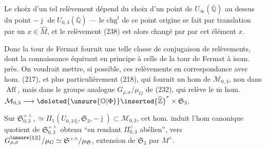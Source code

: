 Le choix d'un tel relèvement dépend du choix d'un point de
$U_\infty(\overline{\mathbb Q})$ au dessus du point $-\bar{\jmath}$
de $U_{0,3}(\overline{\mathbb Q})$ --- le $\mathrm{chg}^{t}$ de ce
point origine se fait par translation par un $x\in\widehat M$,
et le relèvement (238) est alors changé par 
par cet élément $x$.

Donc la tour de Fermat fournit une telle classe de conjugaison
de relèvements, dont la connaissance équivaut en principe
à celle de la tour de Fermat à isom. près. On voudrait mettre,
si possible, ces relèvements en correspondance avec
 hom. (217), et plus particulièrement
 (218), qui fournit un hom
 de $\mathcal M_{0,3}$, non dans
 $\operatorname{Aff}$, mais dans
le groupe analogue $G_{\rho,\sigma}/\mu_G$ de (232), qui relève
le $\overline{\mathrm m}$ hom.
$\mathcal M_{0,3}\longrightarrow
\deleted{\unsure{\mathbb O|\Phi}}\inserted{\widehat{\mathbb Z}}^{*}\times\mathfrak S_3$.




Sur $\mathfrak S_{0,3}^{+\wedge},\simeq
\Pi_1(U_{0,3\,\overline{\mathbb Q}},\mathfrak S_3,-\bar{\jmath})
\subset\mathcal M_{0,3}$,
cet hom. induit l'hom canonique
 quotient de $\mathfrak S_{0,3}^{+\wedge}$
obtenu ``en rendant $\Pi_{0,3}^\wedge$ abélien'',
vers $G_{\rho,\sigma}^{\unsure{\natural|\sharp}}/\mu_G
\simeq\mathfrak S^{+\wedge}/\mu_{\mathfrak S}$, extension de
$\mathfrak S_3$
par $M^\wedge$.

